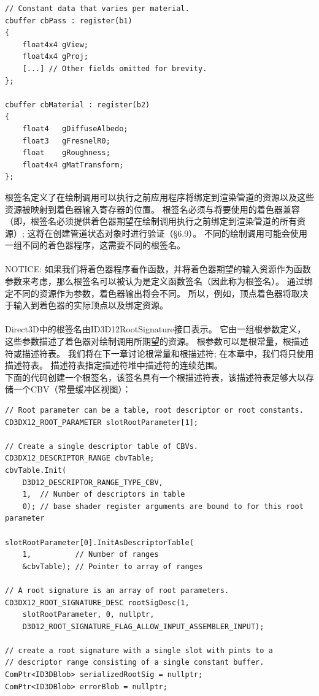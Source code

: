 \documentclass[11pt,a4paper,oldfontcommands]{memoir}
\begin{document}
{\begin{flushleft}
\begin{lstlisting}
// Constant data that varies per material.
cbuffer cbPass : register(b1)
{
    float4x4 gView;
    float4x4 gProj;
    [...] // Other fields omitted for brevity.
};

cbuffer cbMaterial : register(b2)
{
    float4   gDiffuseAlbedo;
    float3   gFresnelR0;
    float    gRoughness;
    float4x4 gMatTransform;
};
\end{lstlisting}
根签名定义了在绘制调用可以执行之前应用程序将绑定到渲染管道的资源以及这些资源被映射到着色器输入寄存器的位置。 根签名必须与将要使用的着色器兼容（即，根签名必须提供着色器期望在绘制调用执行之前绑定到渲染管道的所有资源）; 这将在创建管道状态对象时进行验证（§6.9）。 不同的绘制调用可能会使用一组不同的着色器程序，这需要不同的根签名。\\
~\\
NOTICE: 如果我们将着色器程序看作函数，并将着色器期望的输入资源作为函数参数来考虑，那么根签名可以被认为是定义函数签名（因此称为根签名）。 通过绑定不同的资源作为参数，着色器输出将会不同。 所以，例如，顶点着色器将取决于输入到着色器的实际顶点以及绑定资源。\\
~\\
Direct3D中的根签名由ID3D12RootSignature接口表示。 它由一组根参数定义，这些参数描述了着色器对绘制调用所期望的资源。 根参数可以是根常量，根描述符或描述符表。 我们将在下一章讨论根常量和根描述符; 在本章中，我们将只使用描述符表。 描述符表指定描述符堆中描述符的连续范围。\\
下面的代码创建一个根签名，该签名具有一个根描述符表，该描述符表足够大以存储一个CBV（常量缓冲区视图）：\\
\begin{lstlisting}
// Root parameter can be a table, root descriptor or root constants.
CD3DX12_ROOT_PARAMETER slotRootParameter[1];

// Create a single descriptor table of CBVs.
CD3DX12_DESCRIPTOR_RANGE cbvTable;
cbvTable.Init(
    D3D12_DESCRIPTOR_RANGE_TYPE_CBV,
    1,  // Number of descriptors in table
    0); // base shader register arguments are bound to for this root parameter

slotRootParameter[0].InitAsDescriptorTable(
    1,          // Number of ranges
    &cbvTable); // Pointer to array of ranges

// A root signature is an array of root parameters.
CD3DX12_ROOT_SIGNATURE_DESC rootSigDesc(1, 
    slotRootParameter, 0, nullptr, 
    D3D12_ROOT_SIGNATURE_FLAG_ALLOW_INPUT_ASSEMBLER_INPUT);

// create a root signature with a single slot with pints to a
// descriptor range consisting of a single constant buffer.
ComPtr<ID3DBlob> serializedRootSig = nullptr;
ComPtr<ID3DBlob> errorBlob = nullptr;


\end{lstlisting}
\end{flushleft}}
\end{document}
